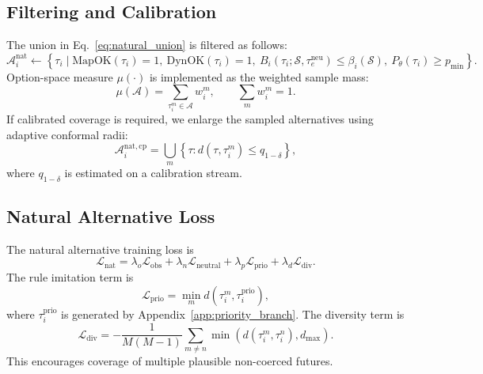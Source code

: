 \documentclass[10pt]{article}
\begin{document}
\subsection{Filtering and Calibration}
\label{app:natural_filtering}

The union in Eq.~\eqref{eq:natural_union} is filtered as follows:
\begin{equation}
    \mathcal{A}^{\mathrm{nat}}_i
    \leftarrow
    \left\{
    \tau_i
    \mid
    \mathrm{MapOK}(\tau_i)=1,\ 
    \mathrm{DynOK}(\tau_i)=1,\ 
    B_i(\tau_i;\mathcal{S},\tau^{\mathrm{neu}}_e)\le \beta_i(\mathcal{S}),\
    P_\theta(\tau_i)\ge p_{\min}
    \right\}.
\end{equation}
Option-space measure $\mu(\cdot)$ is implemented as the weighted sample mass:
\begin{equation}
    \mu(\mathcal{A})
    =
    \sum_{\tau_i^m\in\mathcal{A}} w_i^m,
    \qquad
    \sum_m w_i^m=1 .
\end{equation}
If calibrated coverage is required, we enlarge the sampled alternatives using adaptive conformal radii:
\begin{equation}
    \mathcal{A}^{\mathrm{nat,cp}}_i
    =
    \bigcup_m
    \left\{
    \tau:
    d(\tau,\tau_i^m)\le q_{1-\delta}
    \right\},
\end{equation}
where $q_{1-\delta}$ is estimated on a calibration stream.

\subsection{Natural Alternative Loss}
\label{app:natural_loss}

The natural alternative training loss is
\begin{equation}
    \mathcal{L}_{\mathrm{nat}}
    =
    \lambda_o \mathcal{L}_{\mathrm{obs}}
    +
    \lambda_n \mathcal{L}_{\mathrm{neutral}}
    +
    \lambda_p \mathcal{L}_{\mathrm{prio}}
    +
    \lambda_d \mathcal{L}_{\mathrm{div}}.
\end{equation}
The rule imitation term is
\begin{equation}
    \mathcal{L}_{\mathrm{prio}}
    =
    \min_m
    d(\tau_i^m,\tau_i^{\mathrm{prio}}),
\end{equation}
where $\tau_i^{\mathrm{prio}}$ is generated by Appendix~\ref{app:priority_branch}. The diversity term is
\begin{equation}
    \mathcal{L}_{\mathrm{div}}
    =
    -
    \frac{1}{M(M-1)}
    \sum_{m\neq n}
    \min
    \left(
    d(\tau_i^m,\tau_i^n),
    d_{\max}
    \right).
\end{equation}
This encourages coverage of multiple plausible non-coerced futures.
\end{document}
